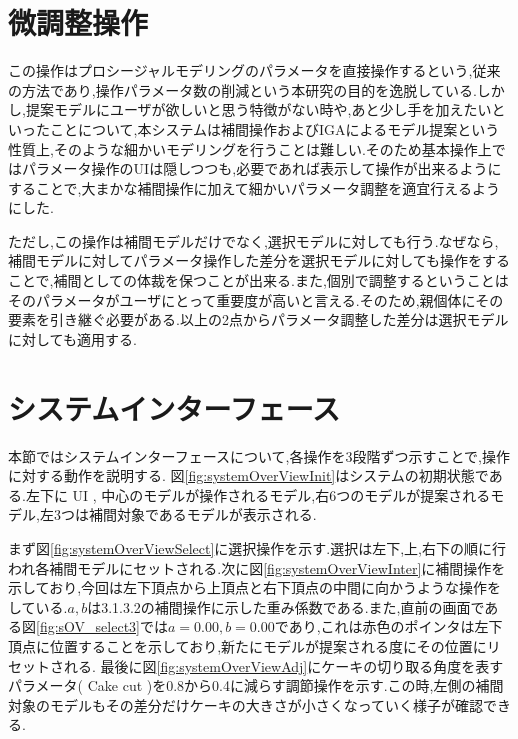 \newpage

\section{微調整操作}
この操作はプロシージャルモデリングのパラメータを直接操作するという,従来の方法であり,操作パラメータ数の削減という本研究の目的を逸脱している.しかし,提案モデルにユーザが欲しいと思う特徴がない時や,あと少し手を加えたいといったことについて,本システムは補間操作およびIGAによるモデル提案という性質上,そのような細かいモデリングを行うことは難しい.そのため基本操作上ではパラメータ操作のUIは隠しつつも,必要であれば表示して操作が出来るようにすることで,大まかな補間操作に加えて細かいパラメータ調整を適宜行えるようにした.


ただし,この操作は補間モデルだけでなく,選択モデルに対しても行う.なぜなら,補間モデルに対してパラメータ操作した差分を選択モデルに対しても操作をすることで,補間としての体裁を保つことが出来る.また,個別で調整するということはそのパラメータがユーザにとって重要度が高いと言える.そのため,親個体にその要素を引き継ぐ必要がある.以上の2点からパラメータ調整した差分は選択モデルに対しても適用する.

\section{システムインターフェース}
本節ではシステムインターフェースについて,各操作を3段階ずつ示すことで,操作に対する動作を説明する.
図\ref{fig:systemOverViewInit}はシステムの初期状態である.左下に UI ,
中心のモデルが操作されるモデル,右6つのモデルが提案されるモデル,左3つは補間対象であるモデルが表示される.


まず図\ref{fig:systemOverViewSelect}に選択操作を示す.選択は左下,上,右下の順に行われ各補間モデルにセットされる.次に図\ref{fig:systemOverViewInter}に補間操作を示しており,今回は左下頂点から上頂点と右下頂点の中間に向かうような操作をしている.$a,b$は3.1.3.2の補間操作に示した重み係数である.また,直前の画面である図\ref{fig:sOV_select3}では$a=0.00,b=0.00$であり,これは赤色のポインタは左下頂点に位置することを示しており,新たにモデルが提案される度にその位置にリセットされる.
最後に図\ref{fig:systemOverViewAdj}にケーキの切り取る角度を表すパラメータ( Cake cut )を0.8から0.4に減らす調節操作を示す.この時,左側の補間対象のモデルもその差分だけケーキの大きさが小さくなっていく様子が確認できる.

